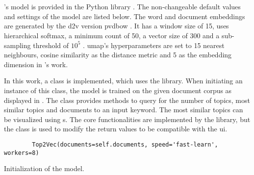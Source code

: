 \section{\topTwovec{}}\label{sec:impl-top2vec}

\citeauthor{Top2Vec2020}'s \topTwovec{} model is provided in the Python library \topTwovec{} \cite{Top2Vec2020}.
The non-changeable default values and settings of the model are listed below.
The word and document embeddings are generated by the \ac{d2v} version \ac{pvdbow} \cite{Top2Vec2020}.
It has a window size of 15, uses hierarchical softmax, a minimum count of 50, a vector size of 300 and a sub-sampling threshold of $10^5$ \cite{Top2Vec2020}.
\ac{umap}'s hyperparameters are set to 15 nearest neighbours, cosine similarity as the distance metric and 5 as the embedding dimension in \citeauthor{Top2Vec2020}'s work.

In this work, a class is implemented, which uses the \topTwovec{} library.
When initiating an instance of this class, the \topTwovec{} model is trained on the given document corpus as displayed in .
The class provides methods to query for the number of topics, 
most similar topics and documents to an input keyword.
The most similar topics can be visualized using \wordcloud{}s.
The core functionalities are implemented by the \topTwovec{} library, but the class is used to modify the return values to be compatible with the \ac{ui}.


\begin{listing}[htp]
    \begin{verbatim}
        Top2Vec(documents=self.documents, speed='fast-learn', workers=8)
    \end{verbatim}
    \caption[Initialization of the \topTwovec{} model]
    {Initialization of the \topTwovec{} model.
    }
    \label{lst:init-top2vec}
\end{listing}